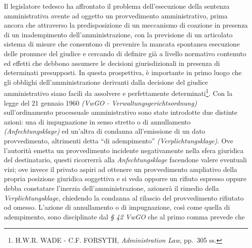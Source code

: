 \documentclass[12pt,it,a4paper,]{report}
\begin{document}
Il legislatore tedesco ha affrontato il problema dell'esecuzione della
sentenza amministrativa avente ad oggetto un provvedimento
amministrativo, prima ancora che attraverso la predisposizione di un
meccanismo di coazione in presenza di un inadempimento
dell'amministrazione, con la previsione di un articolato sistema di
misure che consentono di prevenire la mancata spontanea esecuzione delle
pronunce del giudice e cercando di definire già a livello normativo
contenuto ed effetti che debbono assumere le decisioni giurisdizionali
in presenza di determinati presupposti. In questa prospettiva, è
importante in primo luogo che gli obblighi dell'amministrazione
derivanti dalla decisione del giudice amministrativo siano facili da
assolvere e perfettamente determinati\footnote{H.W.R. WADE - C.F.
  FORSYTH, \emph{Administration Law}, pp.~305 ss.}. Con la legge del 21
gennaio 1960 \emph{(VwGO - Verwaltungsgerichtsordnung)} sull'ordinamento
processuale amministrativo sono state introdotte due distinte azioni:
una di impugnazione in senso stretto o di annullamento
\emph{(Anfechtungsklage)} ed un'altra di condanna all'emissione di un
dato provvedimento, altrimenti detta ``di adempimento''
\emph{(Verplichtungsklage)}. Ove l'autorità emetta un provvedimento
incidente negativamente nella sfera giuridica del destinatario, questi
ricorrerrà alla \emph{Anfechtungsklage} facendone valere eventuali vizi;
ove invece il privato aspiri ad ottenere un provvedimento ampliativo
della propria posizione giuridica soggettiva e si veda opporre un
rifiuto espresso oppure debba constatare l'inerzia dell'amministrazione,
azionerà il rimedio della \emph{Verplichtungsklage}, chiedendo la
condanna al rilascio del provvedimento rifiutato od omesso. L'azione di
annullamento o di impugnazione, così come quella di adempimento, sono
disciplinate dal \emph{§ 42 VwGO} che al primo comma prevede che
\end{document}
